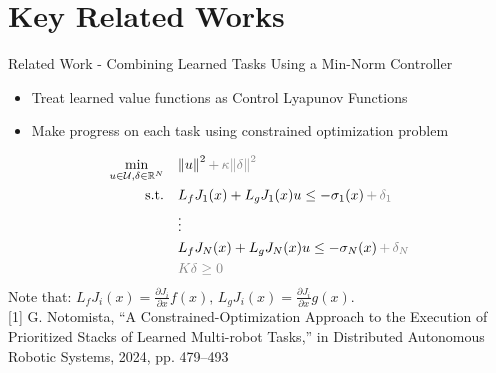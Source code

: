 \section{Key Related Works}

\begin{frame}{Related Work - Combining Learned Tasks Using a Min-Norm Controller}
	\begin{itemize}
		\item{Treat learned value functions as Control Lyapunov Functions}
		\item{Make progress on each task using constrained optimization problem}
	\end{itemize}
	\begin{align*}
		\min_{u \in \mathcal{U}, \delta \in \mathbb{R}^N} \quad & { \lVert u \rVert }^2 \, { \color{gray} + \, \kappa { \lVert \delta \rVert }^2 } \\
		\textrm{s.t.} \quad & L_f {J}_1 (x) + L_g {J}_1 (x) u \le - \sigma_1(x) \, {\color{gray} + \, \delta_1 } \\
                \quad & \vdots \\
		\quad & L_f {J}_N (x) + L_g {J}_N (x) u \le - \sigma_N(x) \, {\color{gray} + \, \delta_N } \\
		\quad & { \color{gray} K \delta \ge 0 }
	\end{align*}
        Note that: $L_f {J}_i(x) = \frac{\partial {J}_i}{\partial x} f(x), \, L_g {J}_i(x) = \frac{\partial {J}_i}{\partial x} g(x)$.\\
	\seprule
	\footnotesize{[1] G. Notomista, “A Constrained-Optimization Approach to the Execution of Prioritized Stacks of Learned Multi-robot Tasks,” in Distributed Autonomous Robotic Systems, 2024, pp. 479–493}
\end{frame}

